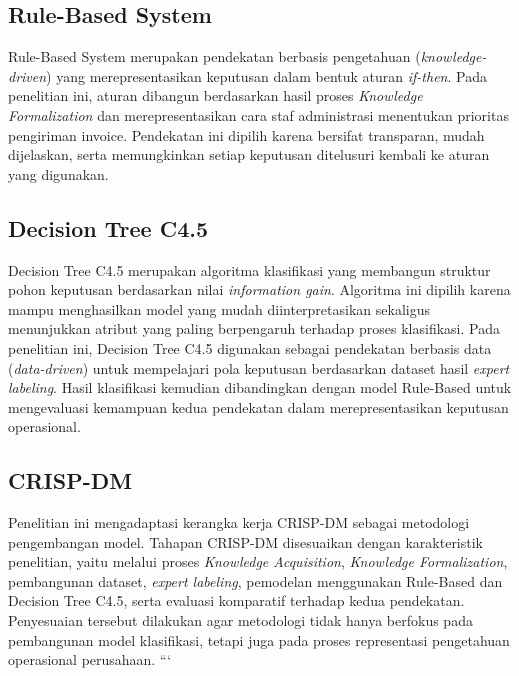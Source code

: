 \subsection{Rule-Based System}

Rule-Based System merupakan pendekatan berbasis pengetahuan (\textit{knowledge-driven}) yang merepresentasikan keputusan dalam bentuk aturan \textit{if-then}. Pada penelitian ini, aturan dibangun berdasarkan hasil proses \textit{Knowledge Formalization} dan merepresentasikan cara staf administrasi menentukan prioritas pengiriman invoice. Pendekatan ini dipilih karena bersifat transparan, mudah dijelaskan, serta memungkinkan setiap keputusan ditelusuri kembali ke aturan yang digunakan.

\subsection{Decision Tree C4.5}

Decision Tree C4.5 merupakan algoritma klasifikasi yang membangun struktur pohon keputusan berdasarkan nilai \textit{information gain}. Algoritma ini dipilih karena mampu menghasilkan model yang mudah diinterpretasikan sekaligus menunjukkan atribut yang paling berpengaruh terhadap proses klasifikasi. Pada penelitian ini, Decision Tree C4.5 digunakan sebagai pendekatan berbasis data (\textit{data-driven}) untuk mempelajari pola keputusan berdasarkan dataset hasil \textit{expert labeling}. Hasil klasifikasi kemudian dibandingkan dengan model Rule-Based untuk mengevaluasi kemampuan kedua pendekatan dalam merepresentasikan keputusan operasional.

\subsection{CRISP-DM}

Penelitian ini mengadaptasi kerangka kerja CRISP-DM sebagai metodologi pengembangan model. Tahapan CRISP-DM disesuaikan dengan karakteristik penelitian, yaitu melalui proses \textit{Knowledge Acquisition}, \textit{Knowledge Formalization}, pembangunan dataset, \textit{expert labeling}, pemodelan menggunakan Rule-Based dan Decision Tree C4.5, serta evaluasi komparatif terhadap kedua pendekatan. Penyesuaian tersebut dilakukan agar metodologi tidak hanya berfokus pada pembangunan model klasifikasi, tetapi juga pada proses representasi pengetahuan operasional perusahaan.
```
